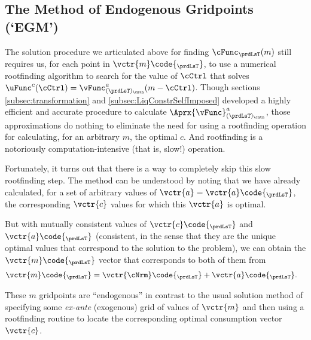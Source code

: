\documentclass[\econtexRoot/SolvingMicroDSOPs]{subfiles}
\begin{document}
\hypertarget{the-method-of-endogenous-gridpoints}{}
\subsection{The Method of Endogenous Gridpoints (`EGM')}\label{subsec:egm}

The solution procedure we articulated above for finding ${\cFunc}_{\prdLsT}({m})$ still requires us, for each point in $\vctr{{m}}\code{_{\prdLsT}}$, to use a numerical rootfinding algorithm to search for the value of $\cCtrl$ that solves $\uFunc^{{c}}(\cCtrl) = \vFunc^{{a}}_{({\prdLsT})_\cntn}({m}-\cCtrl)$.  Though sections \ref{subsec:transformation} and \ref{subsec:LiqConstrSelfImposed} developed a highly efficient and accurate procedure to calculate $\Aprx{\vFunc}^{a}_{(\prdLsT)_\cntn}$, those approximations do nothing to eliminate the need for using a rootfinding operation for calculating, for an arbitrary ${m}$, the optimal ${c}$.  And rootfinding is a notoriously computation-intensive (that is, slow!) operation.

Fortunately, it turns out that there is a way to completely skip this slow rootfinding step.  The method can be understood by noting that we have already calculated, for a set of arbitrary values of $\vctr{a}=\vctr{{a}}\code{_{\prdLsT}}$, the corresponding $\vctr{c}$ values for which this $\vctr{a}$ is optimal.


But with mutually consistent values of $\vctr{{c}}\code{_{\prdLsT}}$ and $\vctr{{a}}\code{_{\prdLsT}}$ (consistent, in the sense that they are the unique optimal values that correspond to the solution to the problem), we can obtain the $\vctr{{m}}\code{_{\prdLsT}}$ vector that corresponds to both of them from
\begin{equation}\begin{gathered}\begin{aligned}
      \vctr{{m}}\code{_{\prdLsT}}  & = {\vctr{{\cNrm}}\code{_{\prdLsT}}+\vctr{{a}}\code{_{\prdLsT}}}.
    \end{aligned}\end{gathered}\end{equation}


These ${m}$ gridpoints are ``endogenous'' in contrast to the usual solution method of specifying some \textit{ex-ante} (exogenous) grid of values of $\vctr{m}$ and then using a rootfinding routine to locate the corresponding optimal consumption vector $\vctr{c}$.
\end{document}
